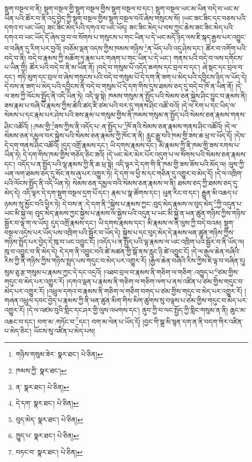 སྡུག་བསྔལ་བ་ནི། སྡུག་བསྔལ་གྱི་སྡུག་བསྔལ་གྱིས་སྡུག་བསྔལ་བ་དང་། སྡུག་བསྔལ་ཡང་མ་ཡིན་བདེ་བ་ཡང་མ་ཡིན་པའི་ཚོར་བ་ནི་འདུ་བྱེད་ཀྱི་སྡུག་བསྔལ་གྱིས་སྡུག་བསྔལ་བའོ་ཞེས་གསུངས་སོ། །ཡང་ཟང་ཟིང་དང་བཅས་པའི་དགའ་བ་ཡང་ཡོད། ཟང་ཟིང་མེད་པའི་དགའ་བ་ཡང་ཡོད། ཟང་ཟིང་མེད་པ་བས་ཀྱང་ཆེས་ཟང་ཟིང་མེད་པའི་དགའ་བ་ཡང་ཡོད་དོ་ཞེས་བྱ་བ་ལ་སོགས་པ་གསུངས་པ་གང་ཡིན་པ་དེ་ཡང་མདོ་ཉིད་ལས་ཇི་སྐད་རྒྱས་པར་འབྱུང་བ་བཞིན་དུ་རིག་པར་བྱའོ། །བཅོམ་ལྡན་འདས་ཀྱིས་ཁམས་གཉིས་\footnote{གཉིས་གསུམ་ཟེར་  སྣར་ཐང་།  པེ་ཅིན། }ན་ཡོད་པའི་འདུ་ཤེས་དང་། ཚོར་བ་འགོག་པའི་བདེ་བ་ནི། བདེ་བ་རྣམས་ཀྱི་མཆོག་ཏུ་རྣམ་པར་གཞག་པ་གང་ཡིན་པ་དེ་ཡང་། གནས་པའི་བདེ་བ་ལས་དགོངས་པ་ཡིན་གྱི། ཚོར་པའི་བདེ་བ་ནི་མ་ཡིན་ནོ། །བདེ་བ་གསུམ་པོ་འདོད་ཆགས་དང་བྲལ་བ་དང་། ཞེ་སྡང་དང་བྲལ་བ་དང་། གཏི་མུག་དང་བྲལ་བ་ཞེས་གསུངས་པའི་བདེ་བ་གསུམ་པོ་དེ་དག་ནི་ཟག་པ་མེད་པའི་དབྱིངས་ཉིད་ལ་ཡོད་དེ། དེ་བས་ན་ཟག་པ་མེད་པའི་དབྱིངས་ནི་བདེ་བ་གསུམ་པོ་དེ་དག་གིས་དུས་ཐམས་ཅད་དུ་བདེ་བ་ཁོ་ན་ཡིན་ནོ། །དེ་ལ་ཟས་ཀྱི་ལོངས་སྤྱོད་ནི་འདི་ཡིན་ཏེ། འདི་ལྟ་སྟེ། ཁམས་གསུམ་ན་སྤྱོད་པའི་སེམས་ཅན་སྐྱེས་ཤིང་བྱུང་བ་རྣམས་ནི། ཟས་རྣམ་པ་བཞི་པོ་རྣམས་ཀྱིས་ཚེའི་ཚད་ཇི་ཙམ་པའི་བར་དུ་གནས་ཤིང་འཚོ་བའོ། །དེ་ལ་རེག་པ་དང་ཡིད་ལ་སེམས་པ་དང་རྣམ་པར་ཤེས་པའི་ཟས་རྣམ་པ་གསུམ་གྱིས་ནི་ཁམས་གསུམ་ན་སྤྱོད་པའི་སེམས་ཅན་རྣམས་གནས་ཤིང་འཚོའོ། །:ཁམ་གྱི་\footnote{ཁམས་ཀྱི་  སྣར་ཐང་། }ཟས་ཀྱིས་ནི་འདོད་པ་:ན་སྤྱོད་པ་\footnote{ན་  སྣར་ཐང་།  པེ་ཅིན། }ཁོ་ནའི་སེམས་ཅན་རྣམས་གནས་ཤིང་འཚོའོ། །དེ་ལ་སེམས་ཅན་དམྱལ་བར་སྐྱེས་པའི་སེམས་ཅན་རྣམས་ཀྱི་ཁོང་ན་ནི། རླུང་རྒྱུ་བའི་ཁམ་གྱི་ཟས་ཆ་ཕྲ་བ་ཡོད་དོ། །དེས་དེ་དག་གནས་ཤིང་འཚོའོ། །དུད་འགྲོ་རྣམས་དང་། ཡི་དགས་རྣམས་དང་། མི་རྣམས་ཀྱི་ནི་ཁམ་གྱི་ཟས་རགས་པ་ཡིན་ཏེ། དེ་དག་གིས་ཁམ་གྱིས་གཅོད་ཅིང་ཟའོ། །དེ་ཡང་མེར་མེར་པོར་འདུག་པ་ལ་སོགས་པའི་སེམས་ཅན་རྣམས་དང་། འདོད་པ་ན་སྤྱོད་པའི་ལྷ་རྣམས་ཀྱི་ནི་ཆ་ཕྲ་སྟེ། འདི་ལྟར་དེ་དག་གི་ནི་ཁམ་གྱི་ཟས་ཟོས་པའི་མོད་ལ། ལུས་ཀྱི་ཡན་ལག་ཐམས་ཅད་དུ་སོང་ནས་ཞུ་པར་འགྱུར་ཏེ། དེ་དག་ལ་ཕྱི་ས་དང་གཅིན་དུ་འགྱུར་བ་མེད་དོ། །དེ་ལ་འཁྲིག་པའི་ལོངས་སྤྱོད་ནི་འདི་ཡིན་ཏེ། སེམས་ཅན་དམྱལ་བའི་སེམས་ཅན་རྣམས་ལ་ནི། ཐམས་ཅད་ཀྱི་ཐམས་ཅད་དུ་མེད་དེ། འདི་ལྟར་དེ་དག་སྡུག་བསྔལ་དྲག་པོ་དང་། རྣམ་པ་སྣ་ཚོགས་དང་། ཡུན་རིང་བ་དང་། རྒྱུན་མི་འཆད་པ་ཉམས་སུ་མྱོང་བའི་ཕྱིར་ཏེ། དེ་བས་ན་:དེ་དག་ནི་\footnote{དེ་དག་  སྣར་ཐང་།  པེ་ཅིན། }སྐྱེས་པ་རྣམས་ཀྱང་:བུད་མེད་རྣམས་ལ་བུད་མེད་\footnote{བུད་མེད་  སྣར་ཐང་།  པེ་ཅིན། }ཀྱི་འདུན་པ་ཡང་མི་སྐྱེ་ལ། བུད་མེད་རྣམས་ཀྱང་སྐྱེས་པ་རྣམས་ལ་སྐྱེས་པའི་འདུན་པ་ཡང་མི་སྐྱེ་ན་ཕན་ཚུན་གཉིས་ཀྱིས་གཉིས་སྦྱོར་བ་ལྟ་ག་ལ་ཡོད། དུད་འགྲོ་རྣམས་དང་། ཡི་དགས་རྣམས་དང་། མི་རྣམས་ལ་ནི་ལུས་ཀྱི་བདེ་བའམ། སྡུག་བསྔལ་འདྲེས་པར་ཡོད་པས་འཁྲིག་པའི་སྦྱོར་བ་ཡོད་དེ། སྐྱེས་པ་དང་བུད་མེད་དེ་རྣམས་ཕན་ཚུན་གཉིས་ཀྱིས་གཉིས་སྤྲོད་པར་བྱེད་དེ་ཁུ་བ་ཡང་འབྱུང་ངོ། །འདོད་པ་ན་སྤྱོད་པའི་ལྷ་རྣམས་ལ་ཡང་འཁྲིག་པའི་སྦྱོར་བ་ནི་ཡོད་ལ། ཁུ་བ་འབྱུང་བ་ནི་མེད་དེ། དེ་དག་ནི་འབྱུང་བའི་ཚེ་མཚན་གྱི་སྒོ་ནས་རླུང་ཉི་ཚེ་འབྱུང་ངོ། །དེ་ལ་རྒྱལ་ཆེན་བཞིའི་རིས་ཀྱི་ནི་གཉིས་ཀྱིས་གཉིས་སྤྲད་པས་གདུང་བ་མེད་པར་འགྱུར་རོ། །རྒྱལ་ཆེན་བཞིའི་རིས་ཀྱིས་ཇི་ལྟ་བ་བཞིན་དུ། སུམ་ཅུ་རྩ་གསུམ་པ་རྣམས་ཀྱང་དེ་དང་འདྲའོ། །འཐབ་བྲལ་བ་རྣམས་ནི་གཅིག་ལ་གཅིག་:འཁྱུད་པ་\footnote{ཁྱུད་པ་  སྣར་ཐང་།  པེ་ཅིན། }ཙམ་གྱིས་གདུང་བ་མེད་པར་འགྱུར་རོ། །དགའ་ལྡན་པ་རྣམས་ནི་གཅིག་ལ་གཅིག་ལག་པ་ནས་འཛིན་པ་ཙམ་གྱིས་གདུང་བ་མེད་པར་འགྱུར་རོ། །འཕྲུལ་དགའ་བ་རྣམས་ནི་གཅིག་ལ་གཅིག་བགད་པ་ཙམ་གྱིས་གདུང་བ་མེད་པར་འགྱུར་རོ། །གཞན་འཕྲུལ་དབང་བྱེད་པ་རྣམས་ཀྱི་ནི་ཕན་ཚུན་མིག་གིས་མིག་ཚུགས་སུ་བལྟས་པ་ཙམ་གྱིས་གདུང་བ་མེད་པར་འགྱུར་རོ། །དེ་ལ་འཛམ་བུའི་གླིང་དང་ཤར་གྱི་ལུས་འཕགས་དང་། ནུབ་ཀྱི་བ་ལང་སྤྱོད་ཀྱི་གླིང་གསུམ་ན་ནི། ཆུང་མ་འཆང་བ་དང་། བག་མ་:གཏོང་བ་\footnote{བཏང་བ་  སྣར་ཐང་།  པེ་ཅིན། }དང་། བག་མ་ལེན་པ་ཡོད་དོ། །བྱང་གི་སྒྲ་མི་སྙན་དག་ན་ནི་བདག་གིར་འཛིན་པ་མེད་ཅིང་། ཡོངས་སུ་འཛིན་པ་མེད་པས། 